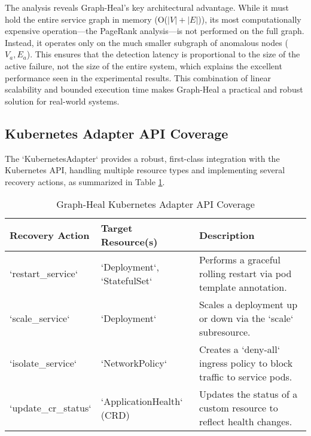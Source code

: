 \documentclass[11pt,conference]{IEEEtran}
\begin{document}
\begin{table}[h!]
\centering
\caption{Theoretical Complexity of RCA Approaches}
\label{tab:complexity-analysis}
\end{table}

The analysis reveals Graph-Heal's key architectural advantage. While it must hold the entire service graph in memory (O($|V| + |E|$)), its most computationally expensive operation—the PageRank analysis—is not performed on the full graph. Instead, it operates only on the much smaller subgraph of anomalous nodes ($V_a, E_a$). This ensures that the detection latency is proportional to the size of the active failure, not the size of the entire system, which explains the excellent performance seen in the experimental results. This combination of linear scalability and bounded execution time makes Graph-Heal a practical and robust solution for real-world systems.


\subsection{Kubernetes Adapter API Coverage}
The `KubernetesAdapter` provides a robust, first-class integration with the Kubernetes API, handling multiple resource types and implementing several recovery actions, as summarized in Table \ref{tab:k8s-adapter}.

\begin{table}[h!]
\centering
\caption{Graph-Heal Kubernetes Adapter API Coverage}
\label{tab:k8s-adapter}
\begin{tabular}{@{}lll@{}}
\toprule
\textbf{Recovery Action} & \textbf{Target Resource(s)} & \textbf{Description} \\ \midrule
`restart_service` & `Deployment`, `StatefulSet` & Performs a graceful rolling restart via pod template annotation. \\
`scale_service` & `Deployment` & Scales a deployment up or down via the `scale` subresource. \\
`isolate_service` & `NetworkPolicy` & Creates a `deny-all` ingress policy to block traffic to service pods. \\
`update_cr_status` & `ApplicationHealth` (CRD) & Updates the status of a custom resource to reflect health changes. \\
\end{tabular}
\end{table}
\end{document}
